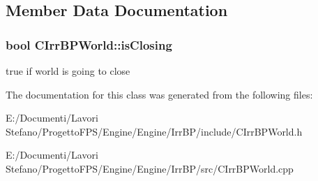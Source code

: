 \subsection{Member Data Documentation}
\hypertarget{class_c_irr_b_p_world_a4659a995f7b084057cad44480cd09cca}{
\subsubsection[{isClosing}]{\setlength{\rightskip}{0pt plus 5cm}bool {\bf CIrrBPWorld::isClosing}}}
\label{class_c_irr_b_p_world_a4659a995f7b084057cad44480cd09cca}
true if world is going to close 

The documentation for this class was generated from the following files:\begin{DoxyCompactItemize}
\item 
E:/Documenti/Lavori Stefano/ProgettoFPS/Engine/Engine/IrrBP/include/CIrrBPWorld.h\item 
E:/Documenti/Lavori Stefano/ProgettoFPS/Engine/Engine/IrrBP/src/CIrrBPWorld.cpp\end{DoxyCompactItemize}
